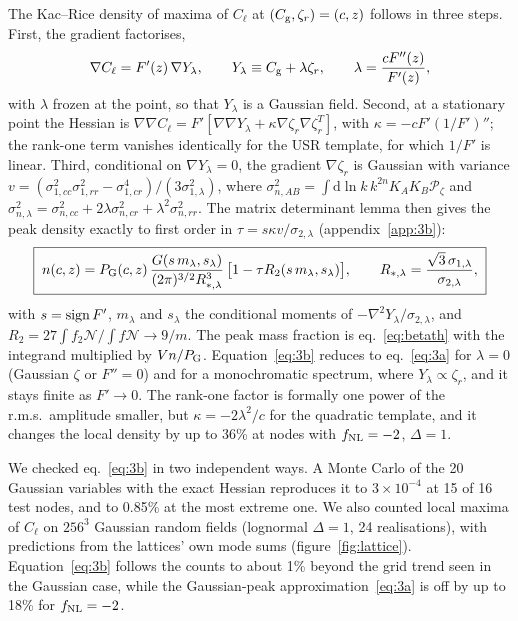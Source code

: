 \documentclass[a4paper,11pt]{article}
\newcommand{\Cg}{C_{\rm g}}
\newcommand{\Cl}{C_{\ell}}
\newcommand{\zr}{\zeta_r}
\newcommand{\dd}{\mathrm{d}}
\newcommand{\fnl}{f_{\rm NL}}
\newcommand{\Pz}{\mathcal{P}_\zeta}
\begin{document}
The Kac--Rice density of maxima of $\Cl$ at $(\Cg,\zr)=(c,z)$ follows in three steps. First, the
gradient factorises,
\begin{equation}
\nabla\Cl=F'(z)\,\nabla Y_\lambda,\qquad Y_\lambda\equiv\Cg+\lambda\zr,\qquad \lambda=\frac{cF''(z)}{F'(z)},
\end{equation}
with $\lambda$ frozen at the point, so that $Y_\lambda$ is a Gaussian field. Second, at a
stationary point the Hessian is $\nabla\nabla\Cl=F'[\nabla\nabla Y_\lambda+\kappa\nabla\zr\nabla\zr^T]$,
with $\kappa=-cF'(1/F')''$; the rank-one term vanishes identically for the USR template, for which
$1/F'$ is linear. Third, conditional on $\nabla Y_\lambda=0$, the gradient $\nabla\zr$ is Gaussian
with variance $v=(\sigma^2_{1,cc}\sigma^2_{1,rr}-\sigma^4_{1,cr})/(3\sigma^2_{1,\lambda})$, where
$\sigma^2_{n,AB}=\int\dd\ln k\,k^{2n}K_AK_B\Pz$ and
$\sigma^2_{n,\lambda}=\sigma^2_{n,cc}+2\lambda\sigma^2_{n,cr}+\lambda^2\sigma^2_{n,rr}$. The matrix
determinant lemma then gives the peak density exactly to first order in
$\tau=s\kappa v/\sigma_{2,\lambda}$ (appendix~\ref{app:3b}):
\begin{equation}
\boxed{\;n(c,z)=P_{\rm G}(c,z)\,\frac{G(s\,m_\lambda,s_\lambda)}{(2\pi)^{3/2}R_{*,\lambda}^3}\,
\big[1-\tau R_2(s\,m_\lambda,s_\lambda)\big],\qquad R_{*,\lambda}=\frac{\sqrt3\,\sigma_{1,\lambda}}{\sigma_{2,\lambda}},\;}
\label{eq:3b}
\end{equation}
with $s={\rm sign}\,F'$, $m_\lambda$ and $s_\lambda$ the conditional moments of
$-\nabla^2Y_\lambda/\sigma_{2,\lambda}$, and $R_2=27\int f_2\mathcal N/\int f\mathcal N\to9/m$. The
peak mass fraction is eq.~\eqref{eq:betath} with the integrand multiplied by $Vn/P_{\rm G}$.
Equation~\eqref{eq:3b} reduces to eq.~\eqref{eq:3a} for $\lambda=0$ (Gaussian $\zeta$ or $F''=0$)
and for a monochromatic spectrum, where $Y_\lambda\propto\zr$, and it stays finite as $F'\to0$.
The rank-one factor is formally one power of the r.m.s.\ amplitude smaller, but
$\kappa=-2\lambda^2/c$ for the quadratic template, and it changes the local density by up to 36\%
at nodes with $\fnl=-2$, $\Delta=1$.

We checked eq.~\eqref{eq:3b} in two independent ways. A Monte Carlo of the 20 Gaussian variables
with the exact Hessian reproduces it to $3\times10^{-4}$ at 15 of 16 test nodes, and to 0.85\% at
the most extreme one. We also counted local maxima of $\Cl$ on $256^3$ Gaussian random fields
(lognormal $\Delta=1$, 24 realisations), with predictions from the lattices' own mode sums
(figure~\ref{fig:lattice}). Equation~\eqref{eq:3b} follows the counts to about 1\% beyond the grid
trend seen in the Gaussian case, while the Gaussian-peak approximation~\eqref{eq:3a} is off by up
to 18\% for $\fnl=-2$.
\end{document}
